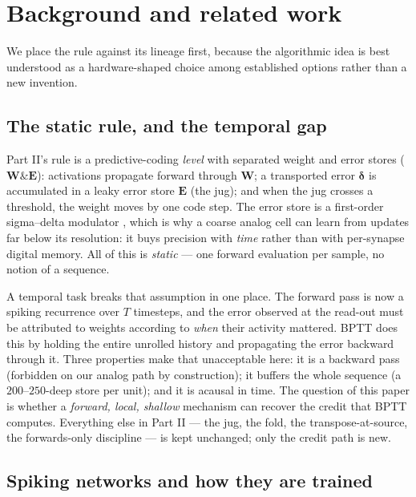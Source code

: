 \documentclass[11pt]{article}
\begin{document}
\hypertarget{sec:background}{%
\section{Background and related work}\label{sec:background}}

We place the rule against its lineage first, because the algorithmic
idea is best understood as a hardware-shaped choice among established
options rather than a new invention.

\hypertarget{the-static-rule-and-the-temporal-gap}{%
\subsection{The static rule, and the temporal
gap}\label{the-static-rule-and-the-temporal-gap}}

Part II's rule is a predictive-coding \emph{level} with separated weight
and error stores (\(\bm W\&\bm E\)): activations propagate forward
through \(\bm W\); a transported error \(\bm\delta\) is accumulated in a
leaky error store \(\bm E\) (the jug); and when the jug crosses a
threshold, the weight moves by one code step. The error store is a
first-order sigma--delta modulator \cite{oconnor2017sigma}, which is
why a coarse analog cell can learn from updates far below its
resolution: it buys precision with \emph{time} rather than with
per-synapse digital memory. All of this is \emph{static} --- one forward
evaluation per sample, no notion of a sequence.

A temporal task breaks that assumption in one place. The forward pass is
now a spiking recurrence over \(T\) timesteps, and the error observed at
the read-out must be attributed to weights according to \emph{when}
their activity mattered. BPTT does this by holding the entire unrolled
history and propagating the error backward through it. Three properties
make that unacceptable here: it is a backward pass (forbidden on our
analog path by construction); it buffers the whole sequence (a
\(200\)--\(250\)-deep store per unit); and it is acausal in time. The
question of this paper is whether a \emph{forward, local, shallow}
mechanism can recover the credit that BPTT computes. Everything else in
Part II --- the jug, the fold, the transpose-at-source, the
forwards-only discipline --- is kept unchanged; only the credit path is
new.

\hypertarget{spiking-networks-and-how-they-are-trained}{%
\subsection{Spiking networks and how they are
trained}\label{spiking-networks-and-how-they-are-trained}}
\end{document}
